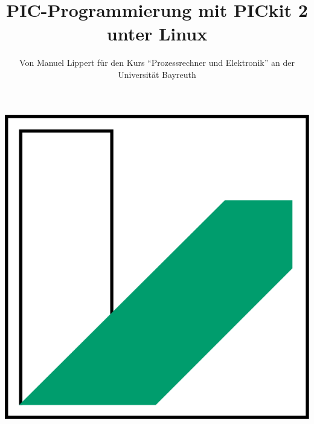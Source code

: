 \documentclass[paper=a4,bibliography=totoc,BCOR=10mm,numbers=noenddot,fontsize=11pt]{article}
\begin{document}
\title{\vspace{-2.0cm}\textbf{\fontsize{30}{0}PIC-Programmierung mit PICkit 2 unter Linux}}
\author{Von Manuel Lippert für den Kurs \enquote{Prozessrechner und Elektronik} an der Universität Bayreuth}
\maketitle
\begin{center}
    \includegraphics[scale=0.1]{UniBT.png}
\end{center}

\vspace{2.5cm}




\newpage






\end{document}
